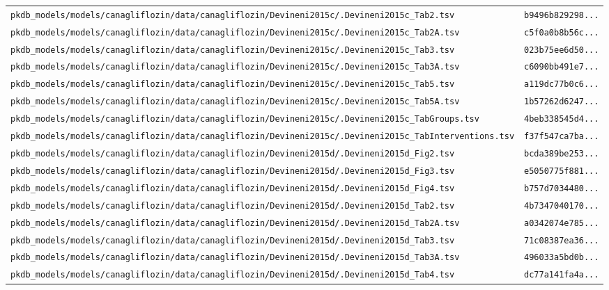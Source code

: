 \begin{longtable}{ll}
\texttt{pkdb\_models/models/canagliflozin/data/canagliflozin/Devineni2015c/.Devineni2015c\_Tab2.tsv} & \texttt{b9496b829298...} \\
\texttt{pkdb\_models/models/canagliflozin/data/canagliflozin/Devineni2015c/.Devineni2015c\_Tab2A.tsv} & \texttt{c5f0a0b8b56c...} \\
\texttt{pkdb\_models/models/canagliflozin/data/canagliflozin/Devineni2015c/.Devineni2015c\_Tab3.tsv} & \texttt{023b75ee6d50...} \\
\texttt{pkdb\_models/models/canagliflozin/data/canagliflozin/Devineni2015c/.Devineni2015c\_Tab3A.tsv} & \texttt{c6090bb491e7...} \\
\texttt{pkdb\_models/models/canagliflozin/data/canagliflozin/Devineni2015c/.Devineni2015c\_Tab5.tsv} & \texttt{a119dc77b0c6...} \\
\texttt{pkdb\_models/models/canagliflozin/data/canagliflozin/Devineni2015c/.Devineni2015c\_Tab5A.tsv} & \texttt{1b57262d6247...} \\
\texttt{pkdb\_models/models/canagliflozin/data/canagliflozin/Devineni2015c/.Devineni2015c\_TabGroups.tsv} & \texttt{4beb338545d4...} \\
\texttt{pkdb\_models/models/canagliflozin/data/canagliflozin/Devineni2015c/.Devineni2015c\_TabInterventions.tsv} & \texttt{f37f547ca7ba...} \\
\texttt{pkdb\_models/models/canagliflozin/data/canagliflozin/Devineni2015d/.Devineni2015d\_Fig2.tsv} & \texttt{bcda389be253...} \\
\texttt{pkdb\_models/models/canagliflozin/data/canagliflozin/Devineni2015d/.Devineni2015d\_Fig3.tsv} & \texttt{e5050775f881...} \\
\texttt{pkdb\_models/models/canagliflozin/data/canagliflozin/Devineni2015d/.Devineni2015d\_Fig4.tsv} & \texttt{b757d7034480...} \\
\texttt{pkdb\_models/models/canagliflozin/data/canagliflozin/Devineni2015d/.Devineni2015d\_Tab2.tsv} & \texttt{4b7347040170...} \\
\texttt{pkdb\_models/models/canagliflozin/data/canagliflozin/Devineni2015d/.Devineni2015d\_Tab2A.tsv} & \texttt{a0342074e785...} \\
\texttt{pkdb\_models/models/canagliflozin/data/canagliflozin/Devineni2015d/.Devineni2015d\_Tab3.tsv} & \texttt{71c08387ea36...} \\
\texttt{pkdb\_models/models/canagliflozin/data/canagliflozin/Devineni2015d/.Devineni2015d\_Tab3A.tsv} & \texttt{496033a5bd0b...} \\
\texttt{pkdb\_models/models/canagliflozin/data/canagliflozin/Devineni2015d/.Devineni2015d\_Tab4.tsv} & \texttt{dc77a141fa4a...} \\

\end{longtable}
